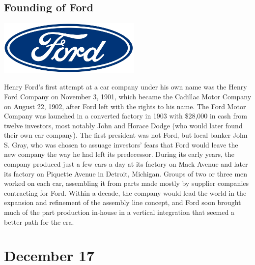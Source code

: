 \documentclass[11pt]{report}
\begin{document}
\subsection{Founding of Ford}
\vspace{2mm}\begin{center}\includegraphics[width=7cm]{./img/fordLogo.jpg}\end{center}
Henry Ford's first attempt at a car company under his own name was the Henry Ford Company on November 3, 1901, which became the Cadillac Motor Company on August 22, 1902, after Ford left with the rights to his name. The Ford Motor Company was launched in a converted factory in 1903 with \$28,000 in cash from twelve investors, most notably John and Horace Dodge (who would later found their own car company). The first president was not Ford, but local banker John S. Gray, who was chosen to assuage investors' fears that Ford would leave the new company the way he had left its predecessor. During its early years, the company produced just a few cars a day at its factory on Mack Avenue and later its factory on Piquette Avenue in Detroit, Michigan. Groups of two or three men worked on each car, assembling it from parts made mostly by supplier companies contracting for Ford. Within a decade, the company would lead the world in the expansion and refinement of the assembly line concept, and Ford soon brought much of the part production in-house in a vertical integration that seemed a better path for the era.
\section{December 17}
\end{document}
